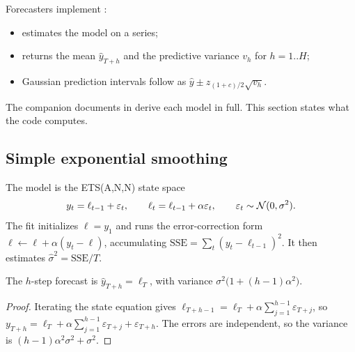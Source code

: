\documentclass[11pt,a4paper]{article}
\makeatletter
\newcommand{\snippetsource}[1]{\csname snippet@#1\endcsname}
\newcommand{\snippet}[3]{%
  }
\makeatother
\begin{document}
Forecasters implement :
\begin{itemize}
  \item {} estimates the model on a series;
  \item {} returns the mean $\hat y_{T+h}$ and the predictive variance $v_h$
        for $h=1..H$;
  \item Gaussian prediction intervals follow as $\hat y\pm z_{(1+c)/2}\sqrt{v_h}$.
\end{itemize}
The companion documents in  derive each model in full. This section states
what the code computes.

\subsection{Simple exponential smoothing}
The model is the ETS(A,N,N) state space
\[
  y_t=\ell_{t-1}+\varepsilon_t,\qquad \ell_t=\ell_{t-1}+\alpha\varepsilon_t,\qquad
  \varepsilon_t\sim\mathcal{N}(0,\sigma^2).
\]
The fit initializes $\ell=y_1$ and runs the error-correction form
$\ell\leftarrow\ell+\alpha(y_t-\ell)$, accumulating $\mathrm{SSE}=\sum_t(y_t-\ell_{t-1})^2$.
It then estimates $\hat\sigma^2=\mathrm{SSE}/T$.

\begin{proposition}
The $h$-step forecast is $\hat y_{T+h}=\ell_T$, with variance $\sigma^2\big(1+(h-1)\alpha^2\big)$.
\end{proposition}
\begin{proof}
Iterating the state equation gives $\ell_{T+h-1}=\ell_T+\alpha\sum_{j=1}^{h-1}\varepsilon_{T+j}$,
so $y_{T+h}=\ell_T+\alpha\sum_{j=1}^{h-1}\varepsilon_{T+j}+\varepsilon_{T+h}$. The errors are
independent, so the variance is $(h-1)\alpha^2\sigma^2+\sigma^2$.
\end{proof}
\snippet{ses_fit}{C++}{SES fit and forecast variance}
\end{document}
